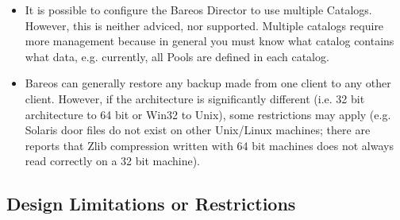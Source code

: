 \begin{itemize}
\item \label{MultipleCatalogs} It is possible to configure the Bareos Director to use multiple Catalogs.
   However, this is neither adviced, nor supported.
   Multiple catalogs require more management because in general
   you must know what catalog contains what data, e.g. currently, all Pools are defined in each catalog.
\item Bareos can generally restore any backup made from one client
   to any other client. However, if the architecture is significantly
   different (i.e. 32 bit architecture to 64 bit or Win32 to Unix),
   some restrictions may apply (e.g. Solaris door files do not exist
   on other Unix/Linux machines; there are reports that Zlib compression
   written with 64 bit machines does not always read correctly on a 32 bit
   machine).
\end{itemize}

\subsection{Design Limitations or Restrictions}
\label{sec:DesignLimitations}

